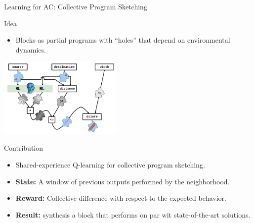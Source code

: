 \documentclass[presentation, 9pt,169]{beamer}\mode<presentation>{\usetheme{AMSBolognaFC}}
\begin{document}
  \begin{frame}{Learning for AC: Collective Program Sketching}
  
  \begin{alertblock}{Idea}
  \begin{itemize}
    \item Blocks as partial programs with ``holes'' that depend on environmental dynamics.
  \end{itemize}
  \end{alertblock}
  \begin{center}
  \includegraphics[width=0.45\textwidth]{img/synthesis-3.png}
  \end{center}
  \begin{exampleblock}{Contribution}
  \begin{itemize}
  \item Shared-experience Q-learning for collective program sketching.
  \item \textbf{State:} A window of previous outputs performed by the neighborhood.
  \item \textbf{Reward:} Collective difference with respect to the expected behavior.
  \item \textbf{Result:}  synthesis a block that performs on par wit state-of-the-art solutions.
  \end{itemize}
  \end{exampleblock}
\end{frame}  
\end{document}
